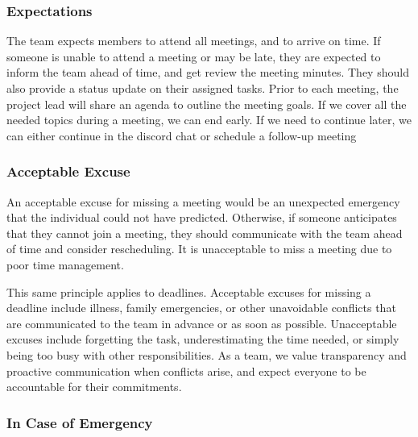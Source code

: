 \documentclass{article}
\begin{document}
\subsubsection*{Expectations}

\begin{comment}
\wss{What are your team's expectations regarding meeting attendance (being on
time, leaving early, missing meetings, etc.)?}
\end{comment}
The team expects members to attend all meetings, and to arrive on time. If someone is unable to attend a meeting or may be late, they are expected to inform the team ahead of time, and get review the meeting minutes. They should also provide a status update on their assigned tasks. Prior to each meeting, the project lead will share an agenda to outline the meeting goals. If we cover all the needed topics during a meeting, we can end early. If we need to continue later, we can either continue in the discord chat or schedule a follow-up meeting

\subsubsection*{Acceptable Excuse}

\begin{comment}
\wss{What constitutes an acceptable excuse for missing a meeting or a deadline?
What types of excuses will not be considered acceptable?}
\end{comment}
An acceptable excuse for missing a meeting would be an unexpected emergency that the individual could not have predicted. Otherwise, if someone anticipates that they cannot join a meeting, they should communicate with the team ahead of time and consider rescheduling. It is unacceptable to miss a meeting due to poor time management.

This same principle applies to deadlines. Acceptable excuses for missing a deadline include illness, family emergencies, or other unavoidable conflicts that are communicated to the team in advance or as soon as possible. Unacceptable excuses include forgetting the task, underestimating the time needed, or simply being too busy with other responsibilities. As a team, we value transparency and proactive communication when conflicts arise, and expect everyone to be accountable for their commitments.
\subsubsection*{In Case of Emergency}
\end{document}
